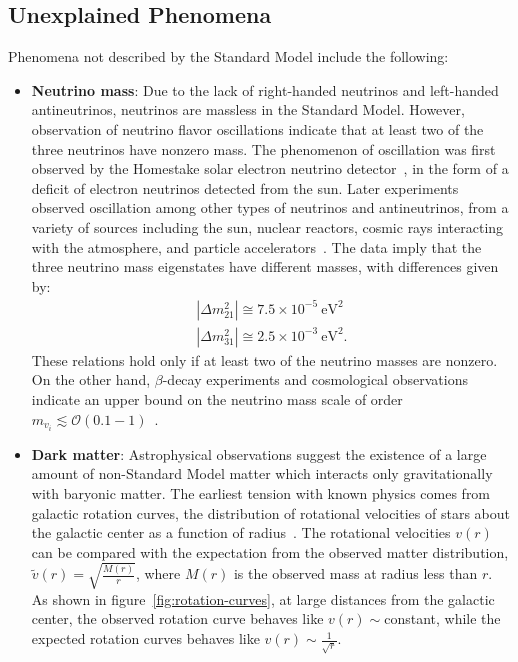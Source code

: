 \subsection{Unexplained Phenomena}\label{sec:bsm-unexplained-phenomena}

Phenomena not described by the Standard Model include the following:

\begin{itemize}
	\item \textbf{Neutrino mass}: Due to the lack of right-handed neutrinos and left-handed antineutrinos, neutrinos are massless in the Standard Model. However, observation of neutrino flavor oscillations indicate that at least two of the three neutrinos have nonzero mass. The phenomenon of oscillation was first observed by the Homestake solar electron neutrino detector~\cite{Cleveland:1998nv}, in the form of a deficit of electron neutrinos detected from the sun. Later experiments observed oscillation among other types of neutrinos and antineutrinos, from a variety of sources including the sun, nuclear reactors, cosmic rays interacting with the atmosphere, and particle accelerators~\cite{pdg}. The data imply that the three neutrino mass eigenstates have different masses, with differences given by:
	\begin{align}\label{eqn:neutrino-mass-differences}
		|\Delta m_{21}^2| \cong 7.5\times 10^{-5}~\mbox{eV}^2 \\
		|\Delta m_{31}^2| \cong 2.5\times 10^{-3}~\mbox{eV}^2.
	\end{align}
	These relations hold only if at least two of the neutrino masses are nonzero. On the other hand, $\beta$-decay experiments and cosmological observations indicate an upper bound on the neutrino mass scale of order $m_{v_i} \lesssim \mathcal{O}(0.1-1)$~\cite{Troitzk, CMB/WMAP, Planck}.

	\item \textbf{Dark matter}: Astrophysical observations suggest the existence of a large amount of non-Standard Model matter which interacts only gravitationally with baryonic matter. The earliest tension with known physics comes from galactic rotation curves, the distribution of rotational velocities of stars about the galactic center as a function of radius~\cite{1980ApJ_238_471R}. The rotational velocities $v(r)$ can be compared with the expectation from the observed matter distribution, $\tilde{v}(r)=\sqrt{\frac{M(r)}{r}}$, where $M(r)$ is the observed mass at radius less than $r$. As shown in figure~\ref{fig:rotation-curves}, at large distances from the galactic center, the observed rotation curve behaves like $v(r)\sim$constant, while the expected rotation curves behaves like $v(r)\sim \frac{1}{\sqrt{r}}$. 


\end{itemize}
